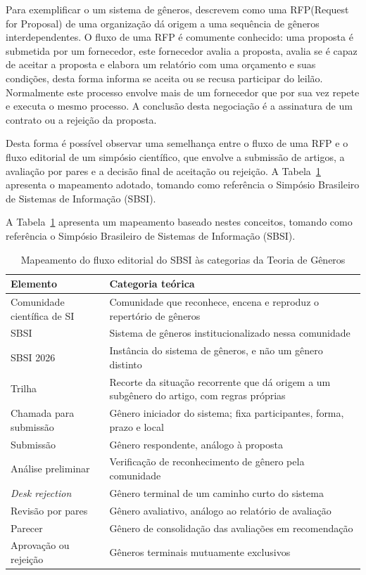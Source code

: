 Para exemplificar o um sistema de gêneros, \cite{GenreSystems} descrevem como uma RFP(Request for Proposal) de uma organização dá origem a uma sequência de gêneros interdependentes. O fluxo de uma RFP é comumente conhecido: uma proposta é submetida por um fornecedor, este fornecedor avalia a proposta, avalia se é capaz de aceitar a proposta e elabora um relatório com uma orçamento e suas condições, desta forma informa se aceita ou se recusa participar do leilão. Normalmente este processo envolve mais de um fornecedor que por sua vez repete e executa o mesmo processo. A conclusão desta negociação é a assinatura de um contrato ou a rejeição da proposta.

Desta forma é possível observar uma semelhança entre o fluxo de uma RFP e o fluxo editorial de um simpósio científico, que envolve a submissão de artigos, a avaliação por pares e a decisão final de aceitação ou rejeição. A Tabela~\ref{tab:mapeamento-generos} apresenta o mapeamento adotado, tomando como referência o Simpósio Brasileiro de Sistemas de Informação (SBSI).

A Tabela~\ref{tab:mapeamento-generos} apresenta um mapeamento baseado nestes conceitos, tomando como referência o Simpósio Brasileiro de Sistemas de Informação (SBSI).


\begin{table}[H]
\centering
\caption{Mapeamento do fluxo editorial do SBSI às categorias da Teoria de Gêneros}
\label{tab:mapeamento-generos}
\footnotesize
\begin{tabular}{|p{4.2cm}|p{9.0cm}|}
\hline
\textbf{Elemento} & \textbf{Categoria teórica} \\
\hline
Comunidade científica de SI\nomenclature{SI}{Sistemas de Informação} & Comunidade que reconhece, encena e reproduz o repertório de gêneros \\
SBSI & Sistema de gêneros institucionalizado nessa comunidade \\
SBSI 2026 & Instância do sistema de gêneros, e não um gênero distinto \\
Trilha & Recorte da situação recorrente que dá origem a um subgênero do artigo, com regras próprias \\
Chamada para submissão & Gênero iniciador do sistema; fixa participantes, forma, prazo e local \\
Submissão & Gênero respondente, análogo à proposta \\
Análise preliminar & Verificação de reconhecimento de gênero pela comunidade \\
\emph{Desk rejection} & Gênero terminal de um caminho curto do sistema \\
Revisão por pares & Gênero avaliativo, análogo ao relatório de avaliação \\
Parecer & Gênero de consolidação das avaliações em recomendação \\
Aprovação ou rejeição & Gêneros terminais mutuamente exclusivos \\
\hline
\end{tabular}
\end{table}
 

